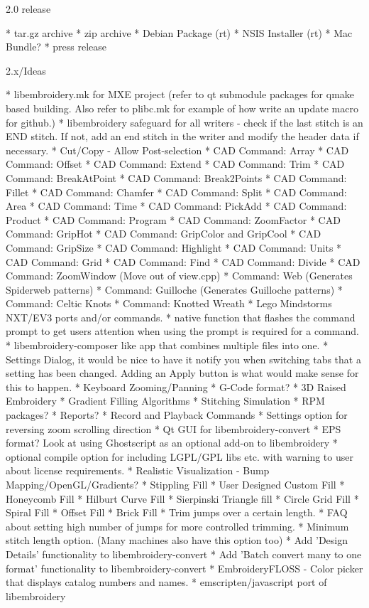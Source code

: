 \documentclass[a4paper]{report}
\begin{document}
{2.0 release
~~~~~~~~~~~

* tar.gz archive
* zip archive
* Debian Package (rt)
* NSIS Installer (rt)
* Mac Bundle?
* press release

2.x/Ideas
~~~~~~~~~

* libembroidery.mk for MXE project (refer to qt submodule packages for qmake based building. Also refer to plibc.mk for example of how write an update macro for github.)
* libembroidery safeguard for all writers - check if the last stitch is an END stitch. If not, add an end stitch in the writer and modify the header data if necessary.
* Cut/Copy - Allow Post-selection
* CAD Command: Array
* CAD Command: Offset
* CAD Command: Extend
* CAD Command: Trim
* CAD Command: BreakAtPoint
* CAD Command: Break2Points
* CAD Command: Fillet
* CAD Command: Chamfer
* CAD Command: Split
* CAD Command: Area
* CAD Command: Time
* CAD Command: PickAdd
* CAD Command: Product
* CAD Command: Program
* CAD Command: ZoomFactor
* CAD Command: GripHot
* CAD Command: GripColor and GripCool
* CAD Command: GripSize
* CAD Command: Highlight
* CAD Command: Units
* CAD Command: Grid
* CAD Command: Find
* CAD Command: Divide
* CAD Command: ZoomWindow (Move out of view.cpp)
* Command: Web (Generates Spiderweb patterns)
* Command: Guilloche (Generates Guilloche patterns)
* Command: Celtic Knots
* Command: Knotted Wreath
* Lego Mindstorms NXT/EV3 ports and/or commands.
* native function that flashes the command prompt to get users attention when using the
prompt is required for a command.
* libembroidery-composer like app that combines multiple files into one.
* Settings Dialog, it would be nice to have it notify you when switching tabs that a
setting has been changed. Adding an Apply button is what would make sense for this to happen.
* Keyboard Zooming/Panning
* G-Code format?
* 3D Raised Embroidery
* Gradient Filling Algorithms
* Stitching Simulation
* RPM packages?
* Reports?
* Record and Playback Commands
* Settings option for reversing zoom scrolling direction
* Qt GUI for libembroidery-convert
* EPS format? Look at using Ghostscript as an optional add-on to libembroidery
* optional compile option for including LGPL/GPL libs etc. with warning to user about license requirements.
* Realistic Visualization - Bump Mapping/OpenGL/Gradients?
* Stippling Fill
* User Designed Custom Fill
* Honeycomb Fill
* Hilburt Curve Fill
* Sierpinski Triangle fill
* Circle Grid Fill
* Spiral Fill
* Offset Fill
* Brick Fill
* Trim jumps over a certain length.
* FAQ about setting high number of jumps for more controlled trimming.
* Minimum stitch length option. (Many machines also have this option too)
* Add 'Design Details' functionality to libembroidery-convert
* Add 'Batch convert many to one format' functionality to libembroidery-convert
* EmbroideryFLOSS - Color picker that displays catalog numbers and names.
* emscripten/javascript port of libembroidery
  
}
\end{document}
